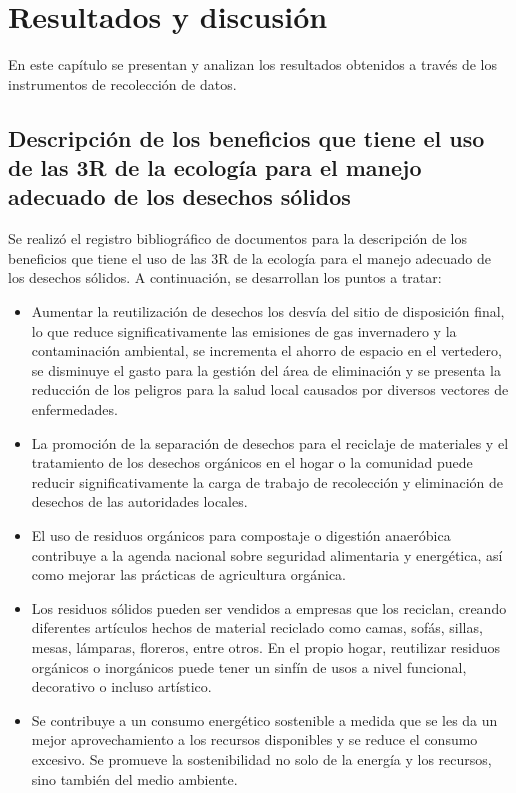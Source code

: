 \vspace*{6cm}
{\setlength{\parskip}{-0.5cm}
\chapter{Resultados y discusión}
}
\newpage

En este capítulo se  presentan y analizan los resultados obtenidos a través de los instrumentos de recolección de datos. 

{\setlength{\parskip}{0cm}
\section{Descripción de los beneficios que tiene el uso de las 3R de la ecología para el manejo adecuado de los desechos sólidos}

Se realizó el registro bibliográfico de documentos para la descripción de los beneficios que tiene el uso de las 3R de la ecología para el manejo adecuado de los desechos sólidos. A continuación, se desarrollan los puntos a tratar:
}

\begin{itemize}
    \item Aumentar la reutilización de desechos los desvía del sitio de disposición final, lo que reduce significativamente las emisiones de gas invernadero y la contaminación ambiental, se incrementa el ahorro de espacio en el vertedero, se disminuye el gasto para la gestión del área de eliminación y se presenta la reducción de los peligros para la salud local causados por diversos vectores de enfermedades.
    
    \item La promoción de la separación de desechos para el reciclaje de materiales y el tratamiento de los desechos orgánicos en el hogar o la comunidad puede reducir significativamente la carga de trabajo de recolección y eliminación de desechos de las autoridades locales.
    
    \item El uso de residuos orgánicos para compostaje o digestión anaeróbica contribuye a la agenda nacional sobre seguridad alimentaria y energética, así como mejorar las prácticas de agricultura orgánica.
    
    \item Los residuos sólidos pueden ser vendidos a empresas que los reciclan, creando diferentes artículos hechos de material reciclado como camas, sofás, sillas, mesas, lámparas, floreros, entre otros. En el propio hogar, reutilizar residuos orgánicos o inorgánicos puede tener un sinfín de usos a nivel funcional, decorativo o incluso artístico.
    
    \item Se contribuye a un consumo energético sostenible a medida que se les da un mejor aprovechamiento a los recursos disponibles y se reduce el consumo excesivo. Se promueve la sostenibilidad no solo de la energía y los recursos, sino también del medio ambiente.
\end{itemize}

